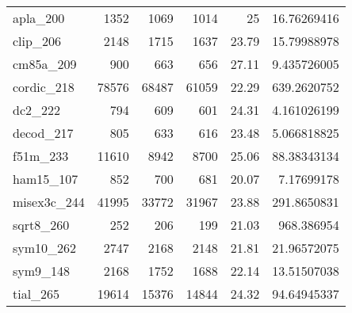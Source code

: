 \begin{table}[tbp]
\begin{tabular}{l|r|r|r|r|r}
      apla\_200                      &1352                      &1069                       &1014                       &25                                  &16.76269416                            \\
      clip\_206                      &2148                      &1715                       &1637                       &23.79                               &15.79988978                            \\
      cm85a\_209                     &900                       &663                        &656                        &27.11                               &9.435726005                            \\
      cordic\_218                    &78576                     &68487                      &61059                      &22.29                               &639.2620752                            \\
      dc2\_222                       &794                       &609                        &601                        &24.31                               &4.161026199                            \\
      decod\_217                     &805                       &633                        &616                        &23.48                               &5.066818825                            \\
      f51m\_233                      &11610                     &8942                       &8700                       &25.06                               &88.38343134                            \\
      ham15\_107                     &852                       &700                        &681                        &20.07                               &7.17699178                             \\
      misex3c\_244                   &41995                     &33772                      &31967                      &23.88                               &291.8650831                            \\
      sqrt8\_260                     &252                       &206                        &199                        &21.03                               &968.386954                             \\
      sym10\_262                     &2747                      &2168                       &2148                       &21.81                               &21.96572075                            \\
      sym9\_148                      &2168                      &1752                       &1688                       &22.14                               &13.51507038                            \\
      tial\_265                      &19614                     &15376                      &14844                      &24.32                               &94.64945337                            \\ \hline
      \end{tabular}
\end{table}

